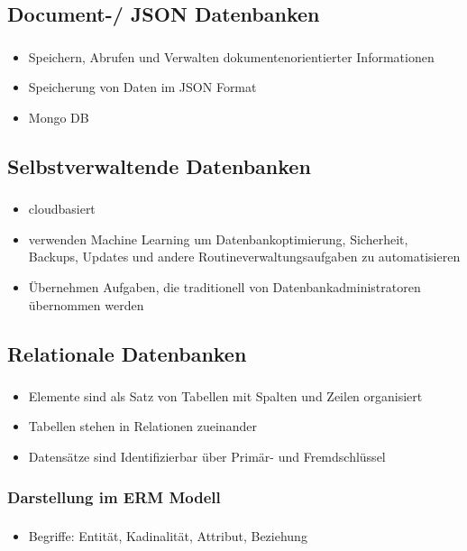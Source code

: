 \documentclass[aspectratio=169,14pt,xcolor=dvipsnames]{beamer}
\begin{document}
\subsection{Document-/ JSON Datenbanken}
\begin{frame}[t]
    \frametitle{\secname}
    \framesubtitle{\subsecname}
    \begin{itemize}
        \item Speichern, Abrufen und Verwalten dokumentenorientierter Informationen
        \item Speicherung von Daten im JSON Format
        \item Mongo DB
    \end{itemize}
\end{frame}

\subsection{Selbstverwaltende Datenbanken}
\begin{frame}[t]
    \frametitle{\secname}
    \framesubtitle{\subsecname}
    \begin{itemize}
        \item cloudbasiert
        \item verwenden Machine Learning um Datenbankoptimierung, Sicherheit, Backups, Updates und andere Routineverwaltungsaufgaben zu automatisieren
        \item Übernehmen Aufgaben, die traditionell von Datenbankadministratoren übernommen werden
    \end{itemize}
\end{frame}

\subsection{Relationale Datenbanken}
\begin{frame}[t]
    \frametitle{\secname}
    \framesubtitle{\subsecname}
    \begin{itemize}
        \item Elemente sind als Satz von Tabellen mit Spalten und Zeilen organisiert
        \item Tabellen stehen in Relationen zueinander
        \item Datensätze sind Identifizierbar über Primär- und Fremdschlüssel
    \end{itemize}
\end{frame}

\subsubsection{Darstellung im ERM Modell}
\begin{frame}[t]
    \frametitle{\subsecname}
    \framesubtitle{\subsubsecname}
    \begin{itemize}
        \item Begriffe: Entität, Kadinalität, Attribut, Beziehung
    \end{itemize}
    
\end{frame}
\end{document}
